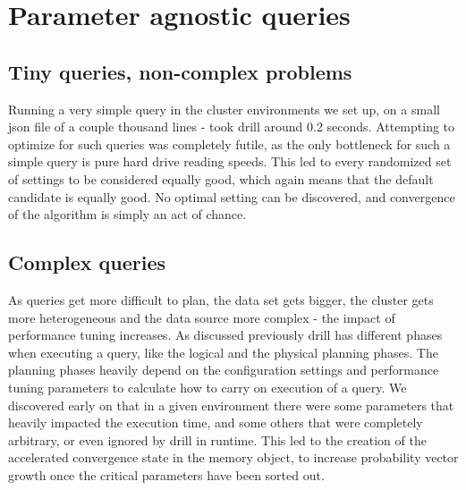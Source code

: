 \documentclass[a4paper,english]{report}
\begin{document}
	\section{Parameter agnostic queries}
		\label{sec:param_agno}
		\subsection{Tiny queries, non-complex problems}
		Running a very simple query in the cluster environments we set up, on a small json file of a couple thousand lines - took drill around 0.2 seconds. Attempting to optimize for such queries was completely futile, as the only bottleneck for such a simple query is pure hard drive reading speeds. This led to every randomized set of settings to be considered equally good, which again means that the default candidate is equally good. No optimal setting can be discovered, and convergence of the algorithm is simply an act of chance.
		\subsection{Complex queries}
		As queries get more difficult to plan, the data set gets bigger, the cluster gets more heterogeneous and the data source more complex - the impact of performance tuning increases. As discussed previously drill has different phases when executing a query, like the logical and the physical planning phases. The planning phases heavily depend on the configuration settings and performance tuning parameters to calculate how to carry on execution of a query. We discovered early on that in a given environment there were some parameters that heavily impacted the execution time, and some others that were completely arbitrary, or even ignored by drill in runtime. This led to the creation of the accelerated convergence state in the memory object, to increase probability vector growth once the critical parameters have been sorted out.
\end{document}
